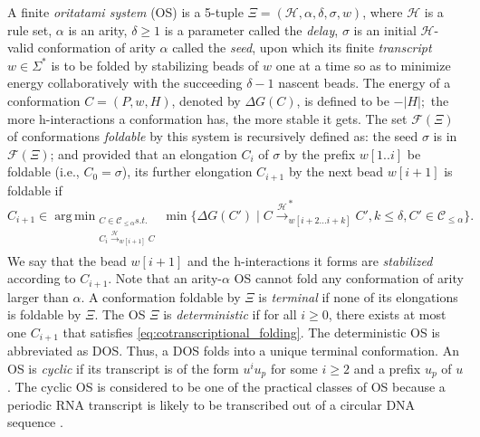 \documentclass[dvipdfmx,review]{elsarticle}
\DeclareMathOperator*{\argmin}{arg\,min}
\begin{document}
A finite \textit{oritatami system} (OS) is a 5-tuple $\Xi = (\mathcal{H}, \alpha, \delta, \sigma,w)$, where 
$\mathcal{H}$ is a rule set,
$\alpha$ is an arity, 
$\delta \geq 1$ is a parameter called the \textit{delay}, 
$\sigma$ is an initial $\mathcal{H}$-valid conformation of arity $\alpha$ called the \textit{seed}, upon which its finite \textit{transcript} $w \in \Sigma^*$ is to be folded by stabilizing beads of $w$ one at a time so as to minimize energy collaboratively with the succeeding $\delta -1$ nascent beads. 
The energy of a conformation $C = (P, w, H)$, denoted by $\Delta G(C)$, is defined to be $-|H|;$ the more h-interactions a conformation has, the more stable it gets.
The set $\mathcal{F}(\Xi)$ of conformations \textit{foldable} by this system is recursively defined as: 
the seed $\sigma$ is in $\mathcal{F}(\Xi)$; and provided that an elongation $C_{i}$ of $\sigma$ by the prefix $w[1..i]$ be foldable (i.e., $C_0 = \sigma$), its further elongation $C_{i+1}$ by the next bead $w[i+1]$ is foldable if
\begin{equation}\label{eq:cotranscriptional_folding}
C_{i+1} \in \argmin_{
\substack{
C \in \mathcal{C}_{\le \alpha} s.t. \\
C_i \xrightarrow{\mathcal{H}}_{w[i+1]}C \\
}
}
\min \Big\{ \Delta G(C') \mid 
C \xrightarrow{\mathcal{H}}^*_{w[i+2...i+k]}C', k\le \delta, C' \in \mathcal{C}_{\le \alpha}
\Big\}.
\end{equation}
We say that the bead $w[i+1]$ and the h-interactions it forms are \textit{stabilized} according to $C_{i+1}$.
Note that an arity-$\alpha$ OS cannot fold any conformation of arity larger than $\alpha$.
A conformation foldable by $\Xi$ is \textit{terminal} if none of its elongations is foldable by $\Xi$. 
The OS $\Xi$ is \textit{deterministic} if for all $i \ge 0$, there exists at most one $C_{i+1}$ that satisfies \eqref{eq:cotranscriptional_folding}. 
The deterministic OS is abbreviated as DOS. 
Thus, a DOS folds into a unique terminal conformation. 
An OS is \textit{cyclic} if its transcript is of the form $u^i u_p$ for some $i \ge 2$ and a prefix $u_p$ of $u$. 
The cyclic OS is considered to be one of the practical classes of OS because a periodic RNA transcript is likely to be transcribed out of a circular DNA sequence \cite{GearyAndersen2014}. 
\end{document}
